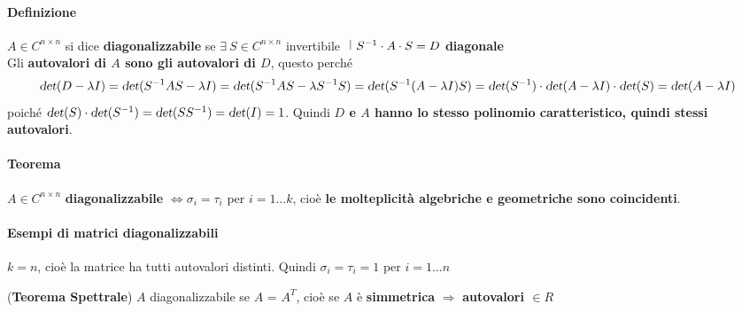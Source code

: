 \documentclass[10pt]{book}
\begin{document}
\paragraph{Definizione} $A \in C^{n \times n}$ si dice \textbf{diagonalizzabile} se $\exists \:S \in C^{n \times n}$ invertibile $\:\:\vline\:\:S^{-1}\cdot A\cdot S = D$ \textbf{diagonale}\\
Gli \textbf{autovalori di $A$ sono gli autovalori di $D$}, questo perché $$\textsl{det}(D - \lambda I) = \textsl{det}(S^{-1}AS - \lambda I) = \textsl{det}(S^{-1}AS - \lambda S^{-1}S) = \textsl{det}(S^{-1}(A - \lambda I)S) = \textsl{det}(S^{-1})\cdot\textsl{det}(A - \lambda I)\cdot\textsl{det}(S) = \textsl{det}(A - \lambda I)$$ poiché $\textsl{det}(S)\cdot\textsl{det}(S^{-1}) = \textsl{det}(SS^{-1}) = \textsl{det}(I) = 1$. Quindi \textbf{$D$ e $A$ hanno lo stesso polinomio caratteristico, quindi stessi autovalori}.
\pagebreak
\paragraph{Teorema} $A \in C^{n \times n}$ \textbf{diagonalizzabile} $\Leftrightarrow \sigma_i = \tau_i$ per $i = 1\ldots k$, cioè \textbf{le molteplicità algebriche e geometriche sono coincidenti}.
\paragraph{Esempi di matrici diagonalizzabili}
\begin{list}{}{}
	\item $k = n$, cioè la matrice ha tutti autovalori distinti. Quindi $\sigma_i = \tau_i = 1$ per $i = 1 \ldots n$
	\item (\textbf{Teorema Spettrale}) $A$ diagonalizzabile se $A$ = $A^T$, cioè se $A$ è \textbf{simmetrica} $\Rightarrow$ \textbf{autovalori $\in R$}
\end{list}
\end{document}
